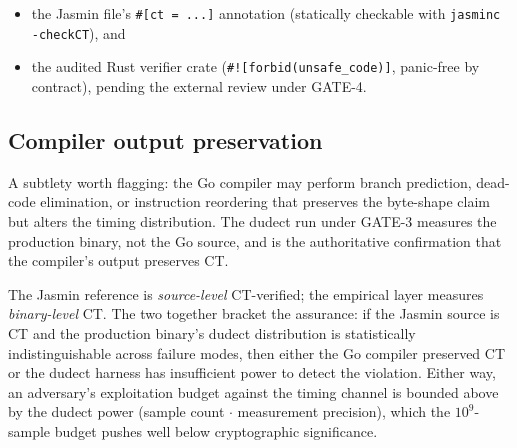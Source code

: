 \begin{itemize}[leftmargin=2em,nosep]
\item the Jasmin file's \texttt{\#[ct = ...]} annotation
  (statically checkable with \texttt{jasminc -checkCT}), and
\item the audited Rust verifier crate
  (\texttt{\#![forbid(unsafe\_code)]}, panic-free by contract),
  pending the external review under GATE-4.
\end{itemize}

\subsection{Compiler output preservation}

A subtlety worth flagging: the Go compiler may perform branch
prediction, dead-code elimination, or instruction reordering that
preserves the byte-shape claim but alters the timing distribution.
The dudect run under GATE-3 measures the production binary, not the
Go source, and is the authoritative confirmation that the compiler's
output preserves CT.

The Jasmin reference is \emph{source-level} CT-verified; the
empirical layer measures \emph{binary-level} CT. The two together
bracket the assurance: if the Jasmin source is CT and the
production binary's dudect distribution is statistically
indistinguishable across failure modes, then either the Go
compiler preserved CT or the dudect harness has insufficient power
to detect the violation. Either way, an adversary's exploitation
budget against the timing channel is bounded above by the dudect
power (sample count $\cdot$ measurement precision), which the
$10^9$-sample budget pushes well below cryptographic significance.

